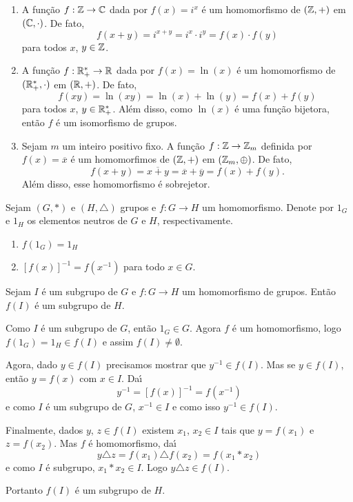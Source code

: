 \begin{exemplos}
	\begin{enumerate}[label={\arabic*})]
		\item A fun\c{c}\~ao $f : \mathbb{Z} \to \mathbb{C}$ dada por $f(x) = i^x$ \'e um homomorfismo de $(\mathbb{Z}, +)$ em $(\mathbb{C}, \cdot)$. De fato,
		\[
			f(x + y) = i^{x + y} = i^x\cdot i^y = f(x)\cdot f(y)
		\]
		para todos $x$, $y \in \mathbb{Z}$.

		\item A fun\c{c}\~ao $f : \mathbb{R}^*_+ \to \mathbb{R}$ dada por $f(x) = \ln(x)$ \'e um homomorfismo de $(\mathbb{R}^*_+, \cdot)$ em $(\mathbb{R}, +)$. De fato,
		\[
			f(xy) = \ln(xy) = \ln(x) + \ln(y) = f(x) + f(y)
		\]
		para todos $x$, $y \in \mathbb{R}^*_+$. Al\'em disso, como $\ln(x)$ \'e uma fun\c{c}\~ao bijetora, ent\~ao $f$ \'e um isomorfismo de grupos.

		\item Sejam $m$ um inteiro positivo fixo. A fun\c{c}\~ao $f: \mathbb{Z} \to \mathbb{Z}_m$ definida por $f(x) = \overline{x}$ \'e um homomorfimos de $(\mathbb{Z}, +)$ em $(\mathbb{Z}_m, \oplus)$. De fato,
		\[
			f(x + y) = \overline{x + y} = \overline{x} + \overline{y} = f(x) + f(y).
		\]
		Al\'em disso, esse homomorfismo \'e sobrejetor.
	\end{enumerate}
\end{exemplos}

\begin{proposicao}
	Sejam $(G, *)$ e $(H, \triangle)$ grupos e $f : G \to H$ um homomorfismo. Denote por $1_G$ e $1_H$ os elementos neutros de $G$ e $H$, respectivamente.
	\begin{enumerate}[label={\roman*})]
		\item $f(1_G) = 1_H$
		\item $[f(x)]^{-1} = f(x^{-1})$ para todo $x \in G$.
	\end{enumerate}
\end{proposicao}

\begin{proposicao}
	Sejam $I$ \'e um subgrupo de $G$ e $f : G \to H$ um homomorfismo de grupos. Ent\~ao $f(I)$ \'e um subgrupo de $H$.
\end{proposicao}
\begin{prova}
	Como $I$ \'e um subgrupo de $G$, ent\~ao $1_G \in G$. Agora $f$ \'e um homomorfismo, logo $f(1_G) = 1_H \in f(I)$ e assim $f(I) \ne \emptyset$.

	Agora, dado $y \in f(I)$ precisamos mostrar que $y^{-1} \in f(I)$. Mas se $y \in f(I)$, ent\~ao $y = f(x)$ com $x \in I$. Da{\'\i}
	\[
		y^{-1} = [f(x)]^{-1} = f(x^{-1})
	\]
	e como $I$ \'e um subgrupo de $G$, $x^{-1} \in I$ e como isso $y^{-1} \in f(I)$.

	Finalmente, dados $y$, $z \in f(I)$ existem $x_1$, $x_2 \in I$ tais que $y = f(x_1)$ e $z = f(x_2)$. Mas $f$ \'e homomorfismo, da{\'\i}
	\[
		y\triangle z = f(x_1)\triangle f(x_2) = f(x_1*x_2)
	\]
	e como $I$ \'e subgrupo, $x_1*x_2 \in I$. Logo $y\triangle z \in f(I)$.

	Portanto $f(I)$ \'e um subgrupo de $H$.
\end{prova}

